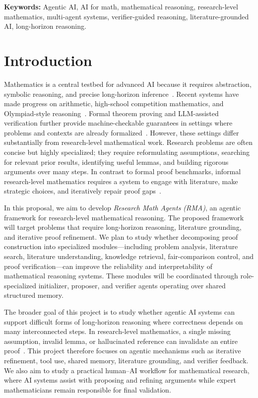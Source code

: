 \documentclass[11pt]{article}
\begin{document}
\noindent\textbf{Keywords:} Agentic AI, AI for math, mathematical reasoning, research-level mathematics, multi-agent systems, verifier-guided reasoning, literature-grounded AI, long-horizon reasoning.

\section*{Introduction}

Mathematics is a central testbed for advanced AI because it requires abstraction, symbolic reasoning, and precise long-horizon inference~\citep{newell1956logic}. Recent systems have made progress on arithmetic, high-school competition mathematics, and Olympiad-style reasoning~\citep{hendrycks2021math,trinh2024alphageometry}. Formal theorem proving and LLM-assisted verification further provide machine-checkable guarantees in settings where problems and contexts are already formalized~\citep{Lean4,polu2020gpt,yang2023leandojo}. However, these settings differ substantially from research-level mathematical work. Research problems are often concise but highly specialized; they require reformulating assumptions, searching for relevant prior results, identifying useful lemmas, and building rigorous arguments over many steps. In contrast to formal proof benchmarks, informal research-level mathematics requires a system to engage with literature, make strategic choices, and iteratively repair proof gaps~\citep{abouzaid2026first,aletheia}.

In this proposal, we aim to develop \emph{Research Math Agents (RMA)}, an agentic framework for research-level mathematical reasoning. The proposed framework will target problems that require long-horizon reasoning, literature grounding, and iterative proof refinement. We plan to study whether decomposing proof construction into specialized modules---including problem analysis, literature search, literature understanding, knowledge retrieval, fair-comparison control, and proof verification---can improve the reliability and interpretability of mathematical reasoning systems. These modules will be coordinated through role-specialized initializer, proposer, and verifier agents operating over shared structured memory.

The broader goal of this project is to study whether agentic AI systems can support difficult forms of long-horizon reasoning where correctness depends on many interconnected steps. In research-level mathematics, a single missing assumption, invalid lemma, or hallucinated reference can invalidate an entire proof~\citep{ji2023towards,frieder2024mathematical}. This project therefore focuses on agentic mechanisms such as iterative refinement, tool use, shared memory, literature grounding, and verifier feedback. We also aim to study a practical human--AI workflow for mathematical research, where AI systems assist with proposing and refining arguments while expert mathematicians remain responsible for final validation.
\end{document}
